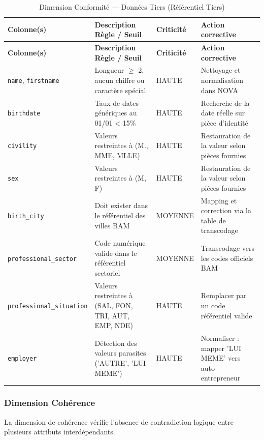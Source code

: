 \begin{longtable}{|p{}|p{}|p{}|p{}|}
\caption{Dimension Conformité — Données Tiers (Référentiel Tiers)} \label{tab:validite_tiers} \\
\hline
\rowcolor{gray!20}
\textbf{Colonne(s)} & \textbf{Description Règle / Seuil} & \textbf{Criticité} & \textbf{Action corrective} \\
\hline
\endfirsthead
\hline
\rowcolor{gray!20}
\textbf{Colonne(s)} & \textbf{Description Règle / Seuil} & \textbf{Criticité} & \textbf{Action corrective} \\
\hline
\endhead
\texttt{name}, \texttt{firstname} & Longueur $\ge$ 2, aucun chiffre ou caractère spécial & HAUTE & Nettoyage et normalisation dans NOVA \\
\hline
\texttt{birthdate} & Taux de dates génériques au 01/01 < 15\% & HAUTE & Recherche de la date réelle sur pièce d'identité \\
\hline
\texttt{civility} & Valeurs restreintes à (M., MME, MLLE) & HAUTE & Restauration de la valeur selon pièces fournies \\
\hline
\texttt{sex} & Valeurs restreintes à (M, F) & HAUTE & Restauration de la valeur selon pièces fournies \\
\hline
\texttt{birth\_city} & Doit exister dans le référentiel des villes BAM & MOYENNE & Mapping et correction via la table de transcodage \\
\hline
\texttt{professional\_}\allowbreak\texttt{sector} & Code numérique valide dans le référentiel sectoriel & MOYENNE & Transcodage vers les codes officiels BAM \\
\hline
\texttt{professional\_}\allowbreak\texttt{situation} & Valeurs restreintes à (SAL, FON, TRI, AUT, EMP, NDE) & HAUTE & Remplacer par un code référentiel valide \\
\hline
\texttt{employer} & Détection des valeurs parasites ('AUTRE', 'LUI MEME') & HAUTE & Normaliser : mapper 'LUI MEME' vers auto-entrepreneur \\
\hline
\end{longtable}

\subsubsection{Dimension Cohérence}
La dimension de cohérence vérifie l'absence de contradiction logique entre plusieurs attributs interdépendants.


